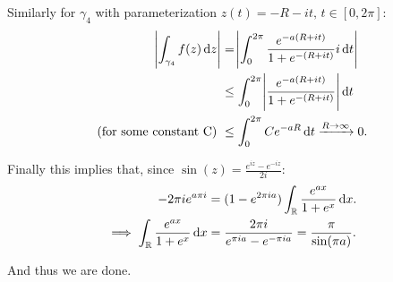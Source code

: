 \begin{example}
Similarly for $\gamma_4$ with parameterization $z(t) = -R - it, \, t \in [0,2\pi ]$:
\begin{align*}
    \abs{\int_{\gamma_4} f(z) \dif z } &=\abs{ \int_0^{2\pi} \frac{e^{-a(R+it)}}{1+e^{-(R+it)}} i \dif t }\\
    &\leq \int_0^{2\pi} \abs{\frac{e^{-a(R+it)}}{1+e^{-(R+it)}}}  \dif t\\
    \text{(for some constant C) } &\leq \int_0^{2\pi} Ce^{-aR}  \dif t \xrightarrow[]{R \to \infty} 0.
\end{align*}

Finally this implies that, since $\sin(z)  = \frac{e^{iz} - e^{-iz}}{2 i}$:
\begin{align*}
    - 2 \pi i e^{a\pi i} &= (1-e^{2\pi i a}) \int_\R \frac{e^{ax}}{1+e^x} \dif x.\\
    \implies \int_\R \frac{e^{ax}}{1+e^x} \dif x &= \frac{2\pi i}{e^{\pi ia} - e^{-\pi i a}} = \frac{\pi}{\sin(\pi a)}.
\end{align*}

And thus we are done.

\end{example}